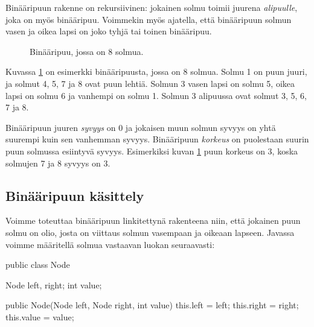 Binääripuun rakenne on rekursiivinen:
jokainen solmu toimii juurena \emph{alipuulle},
joka on myös binääripuu.
Voimmekin myös ajatella, että binääripuun
solmun vasen ja oikea lapsi on joko tyhjä
tai toinen binääripuu.

\begin{figure}
\center
{}
\caption{Binääripuu, jossa on 8 solmua.}
\label{fig:binpuu}
\end{figure}

Kuvassa \ref{fig:binpuu} on esimerkki binääripuusta, jossa on 8 solmua.
Solmu 1 on puun juuri, ja solmut 4, 5, 7 ja 8 ovat puun lehtiä.
Solmun 3 vasen lapsi on solmu 5, oikea lapsi on solmu 6
ja vanhempi on solmu 1.
Solmun 3 alipuussa ovat solmut 3, 5, 6, 7 ja 8.

Binääripuun juuren \emph{syvyys} on 0 ja jokaisen muun solmun syvyys on yhtä
suurempi kuin sen vanhemman syvyys.
Binääripuun \emph{korkeus} on puolestaan suurin puun solmussa
esiintyvä syvyys.
Esimerkiksi kuvan \ref{fig:binpuu} puun korkeus on 3,
koska solmujen 7 ja 8 syvyys on 3.

\subsection{Binääripuun käsittely}

Voimme toteuttaa binääripuun linkitettynä rakenteena niin,
että jokainen puun solmu on olio, josta on viittaus
solmun vasempaan ja oikeaan lapseen.
Javassa voimme määritellä solmua vastaavan luokan seuraavasti:

\begin{code}
public class Node {
    Node left, right;
    int value;

    public Node(Node left, Node right, int value) {
        this.left = left;
        this.right = right;
        this.value = value;
    }
}
\end{code}

